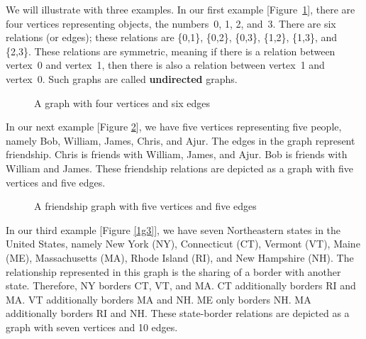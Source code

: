 We will illustrate with three examples. In our first example [Figure~\ref{1g1}], there are four vertices representing objects, the numbers~0, 1, 2, and~3. There are six relations (or edges); these relations are \{0,1\}, \{0,2\}, \{0,3\}, \{1,2\}, \{1,3\}, and \{2,3\}. These relations are symmetric, meaning if there is a relation between vertex~0 and vertex~1, then there is also a relation between vertex~1 and vertex~0. Such graphs are called \textbf{undirected} graphs.
\begin{figure}
\begin{center}
\caption{A graph with four vertices and six edges}\label{1g1}
\end{center}
\end{figure}
\begin{newpage}
\end{newpage}

In our next example [Figure \ref{1g2}], we have five vertices representing five people, namely Bob, William, James, Chris, and Ajur. The edges in the graph represent friendship. Chris is friends with William, James, and Ajur. Bob is friends with William and James. These friendship relations are depicted as a graph with five vertices and five edges.
\begin{figure}
\begin{center}
\caption{A friendship graph with five vertices and five edges}\label{1g2}
\end{center}
\end{figure}


\begin{newpage}
\end{newpage}
In our third example [Figure \ref{1g3}], we have seven Northeastern states in the United States, namely New York (NY), Connecticut (CT), Vermont (VT), Maine (ME), Massachusetts (MA), Rhode Island (RI), and New Hampshire (NH). The relationship represented in this graph is the sharing of a border with another state. Therefore, NY borders CT, VT, and MA. CT additionally borders RI and MA. VT additionally borders MA and NH. ME only borders NH. MA additionally borders RI and NH. These state-border relations are depicted as a graph with seven vertices and 10 edges.

